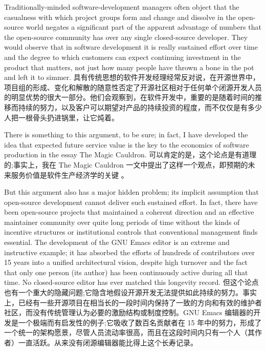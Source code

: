 \documentclass[a4paper,12pt,UTF8,twoside]{ctexbook}
\begin{document}
Traditionally-minded software-development managers often object that the casualness with which project groups form and change and dissolve in the open-source world negates a significant part of the apparent advantage of numbers that the open-source community has over any single closed-source developer. They would observe that in software development it is really sustained effort over time and the degree to which customers can expect continuing investment in the product that matters, not just how many people have thrown a bone in the pot and left it to simmer.
具有传统思想的软件开发经理经常反对说，在开源世界中，项目组的形成、变化和解散的随意性否定了开源社区相对于任何单个闭源开发人员的明显优势的很大一部分。他们会观察到，在软件开发中，重要的是随着时间的推移而持续的努力，以及客户可以期望对产品的持续投资的程度，而不仅仅是有多少人把一根骨头扔进锅里，让它炖着。

There is something to this argument, to be sure; in fact, I have developed the idea that expected future service value is the key to the economics of software production in the essay The Magic Cauldron.
可以肯定的是，这个论点是有道理的;事实上，我在 The Magic Cauldron 一文中提出了这样一个观点，即预期的未来服务价值是软件生产经济学的关键 。

But this argument also has a major hidden problem; its implicit assumption that open-source development cannot deliver such sustained effort. In fact, there have been open-source projects that maintained a coherent direction and an effective maintainer community over quite long periods of time without the kinds of incentive structures or institutional controls that conventional management finds essential. The development of the GNU Emacs editor is an extreme and instructive example; it has absorbed the efforts of hundreds of contributors over 15 years into a unified architectural vision, despite high turnover and the fact that only one person (its author) has been continuously active during all that time. No closed-source editor has ever matched this longevity record.
但这个论点也有一个重大的隐藏问题;它隐含地假设开源开发无法提供如此持续的努力。事实上，已经有一些开源项目在相当长的一段时间内保持了一致的方向和有效的维护者社区，而没有传统管理认为必要的激励结构或制度控制。GNU Emacs 编辑器的开发是一个极端而有启发性的例子;它吸收了数百名贡献者在 15 年中的努力，形成了一个统一的架构愿景，尽管人员流动率很高，而且在这段时间内只有一个人（其作者）一直活跃。从来没有闭源编辑器能比得上这个长寿记录。
\end{document}
